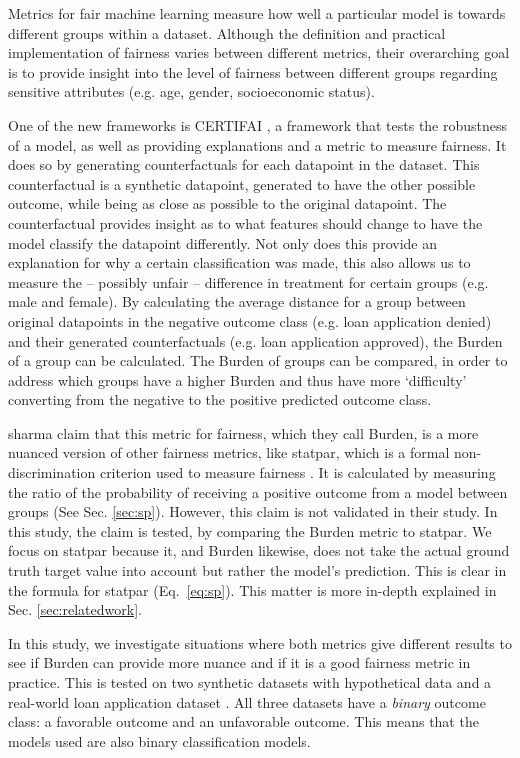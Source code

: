 \documentclass[runningheads]{llncs}
\begin{document}
Metrics for fair machine learning measure how well a particular model is
towards different groups within a dataset. Although the definition and
practical implementation of fairness varies between different metrics, their
overarching goal is to provide insight into the level of fairness between
different groups regarding sensitive attributes (e.g. age, gender,
socioeconomic status).

One of the new frameworks is CERTIFAI \cite{certifai}, a framework that tests
the robustness of a model, as well as providing explanations and a metric to
measure fairness. It does so by generating counterfactuals for each datapoint
in the dataset. This counterfactual is a synthetic datapoint, generated to have
the other possible outcome, while being as close as possible to the original
datapoint. The counterfactual provides insight as to what features should
change to have the model classify the datapoint differently. Not only does this
provide an explanation for why a certain classification was made, this also
allows us to measure the -- possibly unfair -- difference in treatment for
certain groups (e.g. male and female). By calculating the average distance for
a group between original datapoints in the negative outcome class (e.g. loan
application denied) and their generated counterfactuals (e.g. loan application
approved), the \gls{Burden} of a group can be calculated. The \gls{Burden} of
groups can be compared, in order to address which groups have a higher
\gls{Burden} and thus have more `difficulty' converting from the negative to
the positive predicted outcome class.

\gls{sharma} claim that this metric for fairness, which they call \gls{Burden},
is a more nuanced version of other fairness metrics, like \gls{statpar}, which
is a formal non-discrimination criterion used to measure fairness
\cite{kamiran2009demographicparity}. It is calculated by measuring the ratio of
the probability of receiving a positive outcome from a model between groups
(See Sec. \ref{sec:sp}). However, this claim is not validated in their study.
In this study, the claim is tested, by comparing the \gls{Burden} metric to
\gls{statpar}. We focus on \gls{statpar} because it, and \gls{Burden} likewise,
does not take the actual ground truth target value into account but rather the
model's prediction. This is clear in the formula for \gls{statpar}
(Eq.~\ref{eq:sp}). This matter is more in-depth explained in Sec.
\ref{sec:relatedwork}.

In this study, we investigate situations where both metrics give different
results to see if \gls{Burden} can provide more nuance and if it is a good
fairness metric in practice. This is tested on two synthetic datasets with
hypothetical data and a real-world loan application dataset \cite{dataset}. All
three datasets have a \emph{binary} outcome class: a favorable outcome and an
unfavorable outcome. This means that the models used are also binary
classification models.
\end{document}
